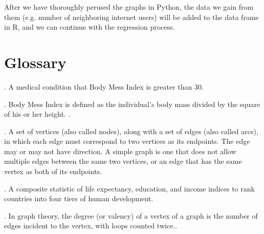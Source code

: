 \documentclass[oneside,12pt]{report}
\begin{document}
After we have thoroughly perused the graphs in Python, the data we gain from them (e.g. number of neighboring internet users) will be added to the data frame in R, and we can continue with the regression process.



\appendix
{}


\chapter{Glossary}\label{Glossary}

\vspace{12pt}

\vspace{8pt}
. A medical condition that Body Mess Index is greater than 30.

\vspace{8pt}
. Body Mess Index is defined as the individual's body mass divided by the square of his or her height. .

\vspace{8pt}
. A set of vertices (also called nodes), along with a set of edges (also called arcs), in which each edge must correspond to two vertices as its endpoints. The edge may or may not have direction. A simple graph is one that does not allow multiple edges between the same two vertices, or an edge that has the same vertex as both of its endpoints.

\vspace{8pt}
. A composite statistic of life expectancy, education, and income indices to rank countries into four tiers of human development.

\vspace{8pt} . In graph theory, the degree (or valency) of a vertex of a graph is the number of edges incident to the vertex, with loops counted twice..
\end{document}
